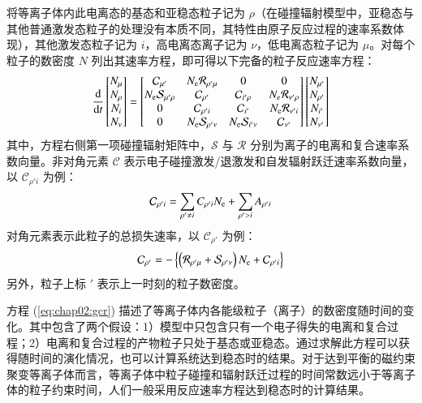 将等离子体内此电离态的基态和亚稳态粒子记为 $\rho$（在碰撞辐射模型中，亚稳态与其他普通激发态粒子的处理没有本质不同，其特性由原子反应过程的速率系数体现），其他激发态粒子记为 $i$，高电离态离子记为 $\nu$，低电离态粒子记为 $\mu$。对每个粒子的数密度 $N$ 列出其速率方程，即可得以下完备的粒子反应速率方程\cite{Summers2006}：
\begin{equation}
\label{eq:chap02:gcr}
\frac{{\rm d}}{{\rm d}t}
\begin{bmatrix}N_\mu\\ N_\rho\\ N_i\\ N_\nu\end{bmatrix}
=
\begin{bmatrix}
	\mathcal{C}_{\mu'} 	& N_{\rm e}\mathcal{R}_{\rho'\mu} & 0 & 0 \\
	N_{\rm e}\mathcal{S}_{\mu'\rho} & \mathcal{C}_{\rho'} & \mathcal{C}_{i'\rho} & N_e\mathcal{R}_{\nu'\rho} \\
	0 & \mathcal{C}_{\rho'i} & \mathcal{C}_{i'} & N_{\rm e}\mathcal{R}_{\nu'i} \\
	0 & N_{\rm e}\mathcal{S}_{\rho'\nu} & N_{\rm e}\mathcal{S}_{i'\nu} & \mathcal{C}_{\nu'}
\end{bmatrix}
\begin{bmatrix}
	N_{\mu'}\\ N_{\rho'}\\ N_{i'}\\ N_{\nu'}
\end{bmatrix}
\end{equation}
其中，方程右侧第一项碰撞辐射矩阵中，$\mathcal{S}$ 与 $\mathcal{R}$ 分别为离子的电离和复合速率系数向量。非对角元素 $\mathcal{C}$ 表示电子碰撞激发/退激发和自发辐射跃迁速率系数向量，以 $\mathcal{C}_{\rho'i}$ 为例：
\begin{equation}
  \mathcal{C}_{\rho'i}=\sum_{\rho'\ne i}C_{\rho'i}N_{\rm e}+\sum_{\rho'>i}A_{\rho'i}
\end{equation}
对角元素表示此粒子的总损失速率，以 $\mathcal{C}_{\rho'}$ 为例：
\begin{equation}
  \mathcal{C}_{\rho'}=-\left\{\left(\mathcal{R}_{\rho'\mu}+\mathcal{S}_{\rho'\nu}\right)N_{\rm e}+\mathcal{C}_{\rho'i}\right\}
\end{equation}
另外，粒子上标 $'$ 表示上一时刻的粒子数密度。

方程 (\ref{eq:chap02:gcr}) 描述了等离子体内各能级粒子（离子）的数密度随时间的变化。其中包含了两个假设：1）模型中只包含只有一个电子得失的电离和复合过程；2）电离和复合过程的产物粒子只处于基态或亚稳态。通过求解此方程可以获得随时间的演化情况，也可以计算系统达到稳态时的结果。对于达到平衡的磁约束聚变等离子体而言，等离子体中粒子碰撞和辐射跃迁过程的时间常数远小于等离子体的粒子约束时间，人们一般采用反应速率方程达到稳态时的计算结果。

